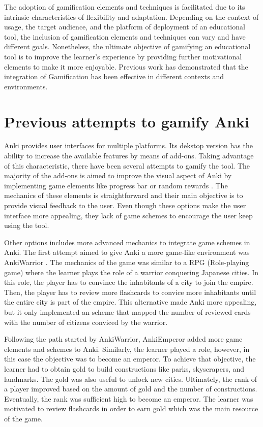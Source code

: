 The adoption of gamification elements and techniques is facilitated due to its intrinsic characteristics of flexibility and adaptation. Depending on the context of usage, the target audience, and the platform of deployment of an educational tool, the inclusion of gamification elements and techniques can vary and have different goals. Nonetheless, the ultimate objective of gamifying an educational tool is to improve the learner's experience by providing further motivational elements to make it more enjoyable. Previous work has demonstrated that the integration of Gamification has been effective in different contexts and environments.

\section{Previous attempts to gamify Anki}
Anki provides user interfaces for multiple platforms. Its dekstop version has the ability to increase the available features by means of add-ons. Taking advantage of this characteristic, there have been several attempts to gamify the tool. The majority of the add-ons is aimed to improve the visual aspect of Anki by implementing game elements like progress bar \citep{glut2017progress} or random rewards \citep{glut2017puppy}. The mechanics of these elements is straightforward and their main objective is to provide visual feedback to the user. Even though these options make the user interface more appealing, they lack of game schemes to encourage the user keep using the tool.

Other options includes more advanced mechanics to integrate game schemes in Anki. The first attempt aimed to give Anki a more game-like environment was AnkiWarrior \citep{proxx2010warrior}. The mechanics of the game was similar to a RPG (Role-playing game) where the learner plays the role of a warrior conquering Japanese cities. In this role, the player has to convince the inhabitants of a city to join the empire. Then, the player has to review more flashcards to convice more inhabitants until the entire city is part of the empire. This alternative made Anki more appealing, but it only implemented an scheme that mapped the number of reviewed cards with the number of citizens conviced by the warrior.

Following the path started by AnkiWarrior, AnkiEmperor \citep{proxx2012emperor} added more game elements and schemes to Anki. Similarly, the learner played a role, however, in this case the objective was to become an emperor. To achieve that objective, the learner had to obtain gold to build constructions like parks, skyscrapers, and landmarks. The gold was also useful to unlock new cities. Ultimately, the rank of a player improved based on the amount of gold and the number of constructions. Eventually, the rank was sufficient high to become an emperor. The learner was motivated to review flashcards in order to earn gold which was the main resource of the game.

